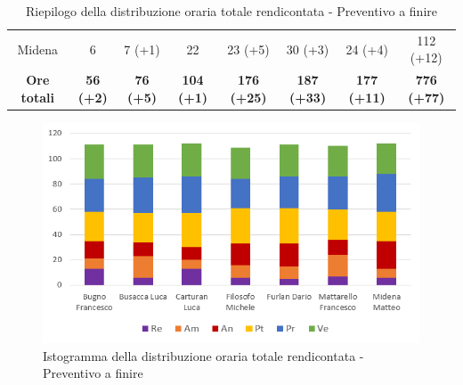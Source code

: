 \begin{table}[H]
\begin{tabular}{c|c|c|c|c|c|c|c}
    Midena              & 6                                                             & 7 (+1)           & 22                & 23 (+5)            & 30 (+3)            & 24 (+4)            & 112 (+12)          \\
    \textbf{Ore totali} & \textbf{56 (+2)}                                              & \textbf{76 (+5)} & \textbf{104 (+1)} & \textbf{176 (+25)} & \textbf{187 (+33)} & \textbf{177 (+11)} & \textbf{776 (+77)}
  \end{tabular}
  \caption{Riepilogo della distribuzione oraria totale rendicontata - Preventivo a finire}
\end{table}

\begin{figure}[H]
  \centering
  \includegraphics[scale=0.8]{immagini/ore_lavoro_preventivo_finire_PB.png}
  \caption{Istogramma della distribuzione oraria totale rendicontata - Preventivo a finire}
\end{figure}


